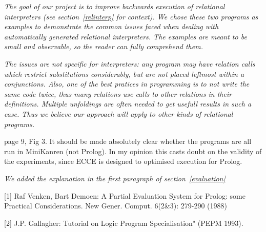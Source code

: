 \emph{The goal of our project is to improve backwards execution of relational interpreters (see section~\ref{relinterp} for context). We chose these two programs as examples to demonstrate the common issues faced when dealing with automatically generated relational interpreters. The examples are meant to be small and observable, so the reader can fully comprehend them.}

\emph{The issues are not specific for interpreters: any program may have relation calls which restrict substitutions considerably, but are not placed leftmost within a conjunctions. Also, one of the best pratices in programming is to not write the same code twice, thus many relations use calls to other relations in their definitions. Multiple unfoldings are often needed to get usefull results in such a case. Thus we believe our approach will apply to other kinds of relational programs. }

page 9, Fig 3.  It should be made absolutely clear whether the programs are all run in MiniKanren (not Prolog). In my opinion this casts doubt on the validity of the experiments, since ECCE is designed to optimised execution for Prolog.

\emph{We added the explanation in the first paragraph of section~\ref{evaluation}}


[1] Raf Venken, Bart Demoen:
A Partial Evaluation System for Prolog: some Practical Considerations. New Gener. Comput. 6(2\&3): 279-290 (1988)

[2] J.P. Gallagher: Tutorial on Logic Program Specialisation"  (PEPM 1993).
